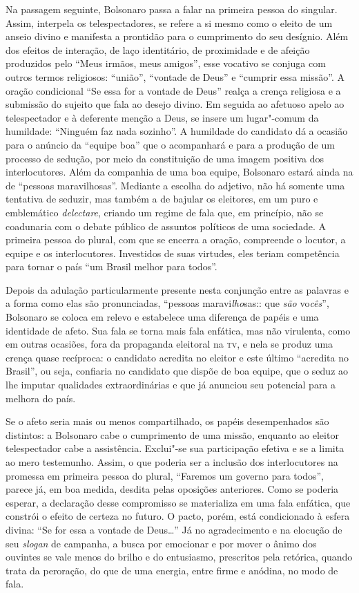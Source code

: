 Na passagem seguinte, Bolsonaro passa a falar na primeira pessoa do
singular. Assim, interpela os telespectadores, se refere a si mesmo como
o eleito de um anseio divino e manifesta a prontidão para o cumprimento
do seu desígnio. Além dos efeitos de interação, de laço identitário, de
proximidade e de afeição produzidos pelo ``Meus irmãos, meus amigos'',
esse vocativo se conjuga com outros termos religiosos: ``união'',
``vontade de Deus'' e ``cumprir essa missão''. A oração condicional ``Se
essa for a vontade de Deus'' realça a crença religiosa e a submissão do
sujeito que fala ao desejo divino. Em seguida ao afetuoso apelo ao
telespectador e à deferente menção a Deus, se insere um lugar"-comum da
humildade: ``Ninguém faz nada sozinho''. A humildade do candidato dá a
ocasião para o anúncio da ``equipe boa'' que o acompanhará e para a
produção de um processo de sedução, por meio da constituição de uma
imagem positiva dos interlocutores. Além da companhia de uma boa equipe,
Bolsonaro estará ainda na de ``pessoas maravilhosas''. Mediante a
escolha do adjetivo, não há somente uma tentativa de seduzir, mas também
a de bajular os eleitores, em um puro e emblemático \emph{delectare},
criando um regime de fala que, em princípio, não se coadunaria com o
debate público de assuntos políticos de uma sociedade. A primeira pessoa
do plural, com que se encerra a oração, compreende o locutor, a equipe e
os interlocutores. Investidos de suas virtudes, eles teriam competência
para tornar o país ``um Brasil melhor para todos''.

Depois da adulação particularmente presente nesta conjunção entre as
palavras e a forma como elas são pronunciadas, ``pessoas
maravi\emph{lho}sas:: que \emph{são} vo\emph{cês}'', Bolsonaro se coloca
em relevo e estabelece uma diferença de papéis e uma identidade de
afeto. Sua fala se torna mais fala enfática, mas não virulenta, como em
outras ocasiões, fora da propaganda eleitoral na \textsc{tv}, e nela se produz
uma crença quase recíproca: o candidato acredita no eleitor e este
último ``acredita no Brasil'', ou seja, confiaria no candidato que
dispõe de boa equipe, que o seduz ao lhe imputar qualidades
extraordinárias e que já anunciou seu potencial para a melhora do país.

Se o afeto seria mais ou menos compartilhado, os papéis desempenhados
são distintos: a Bolsonaro cabe o cumprimento de uma missão, enquanto ao
eleitor telespectador cabe a assistência. Exclui"-se sua participação
efetiva e se a limita ao mero testemunho. Assim, o que poderia ser a
inclusão dos interlocutores na promessa em primeira pessoa do plural,
``Faremos um governo para todos'', parece já, em boa medida, desdita
pelas oposições anteriores. Como se poderia esperar, a declaração desse
compromisso se materializa em uma fala enfática, que constrói o efeito
de certeza no futuro. O pacto, porém, está condicionado à esfera divina:
``Se for essa a vontade de Deus\ldots{}'' Já no agradecimento e na elocução
de seu \emph{slogan} de campanha, a busca por emocionar e por mover o
ânimo dos ouvintes se vale menos do brilho e do entusiasmo, prescritos
pela retórica, quando trata da peroração, do que de uma energia, entre
firme e anódina, no modo de fala.

